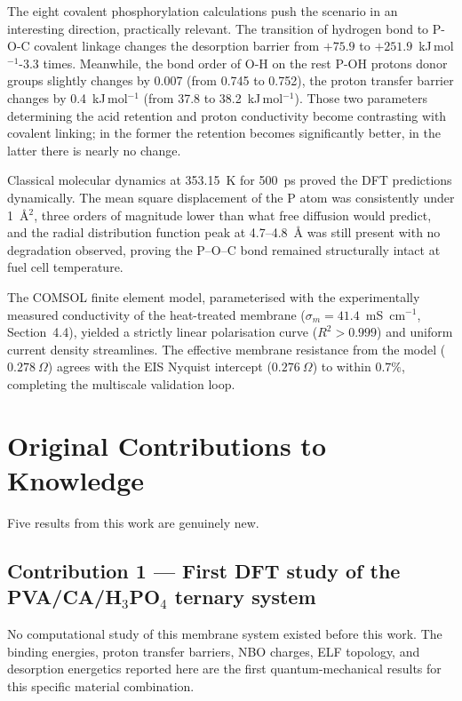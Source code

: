 \documentclass[12pt,a4paper]{report}
\begin{document}
The eight covalent phosphorylation calculations push the scenario in an interesting direction, practically relevant. The transition of hydrogen bond to P-O-C covalent linkage changes the desorption barrier from $+75.9$ to $+251.9$~kJ\,mol\(^{-1}\)-3.3 times. Meanwhile, the bond order of O-H on the rest P-OH protons donor groups slightly changes by 0.007 (from 0.745 to 0.752), the proton transfer barrier changes by 0.4~kJ\,mol\(^{-1}\) (from 37.8 to 38.2~kJ\,mol\(^{-1}\)). Those two parameters determining the acid retention and proton conductivity become contrasting with covalent linking; in the former the retention becomes significantly better, in the latter there is nearly no change.

Classical molecular dynamics at 353.15~K for 500~ps proved the DFT predictions dynamically. The mean square displacement of the P atom was consistently under 1~\AA\(^2\), three orders of magnitude lower than what free diffusion would predict, and the radial distribution function peak at 4.7--4.8~\AA{} was still present with no degradation observed, proving the P–O–C bond remained structurally intact at fuel cell temperature.

The COMSOL finite element model, parameterised with the experimentally measured conductivity of the heat-treated membrane ($\sigma_m = 41.4$~mS~cm$^{-1}$, Section~4.4), yielded a strictly linear polarisation curve ($R^2 > 0.999$) and uniform current density streamlines. The effective membrane resistance from the model ($0.278~\Omega$) agrees with the EIS Nyquist intercept ($0.276~\Omega$) to within $0.7\%$, completing the multiscale validation loop.

\section{Original Contributions to Knowledge}

Five results from this work are genuinely new.

\subsection*{Contribution 1 --- First DFT study of the 
PVA/CA/H\(_3\)PO\(_4\) ternary system}

No computational study of this membrane system existed 
before this work. The binding energies, proton transfer 
barriers, NBO charges, ELF topology, and desorption 
energetics reported here are the first quantum-mechanical 
results for this specific material combination.
\end{document}
